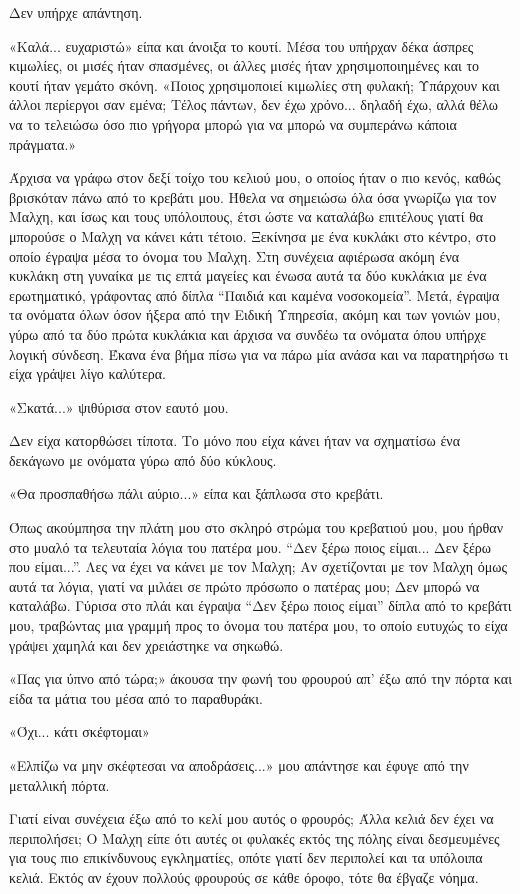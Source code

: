 \documentclass[12pt,twoside, openany]{book}
\begin{document}
Δεν υπήρχε απάντηση.

«Καλά... ευχαριστώ» είπα και άνοιξα το κουτί. Μέσα του υπήρχαν δέκα άσπρες κιμωλίες, οι μισές ήταν σπασμένες, οι άλλες μισές ήταν χρησιμοποιημένες και το κουτί ήταν γεμάτο σκόνη. «Ποιος χρησιμοποιεί κιμωλίες στη φυλακή; Υπάρχουν και άλλοι περίεργοι σαν εμένα; Τέλος πάντων, δεν έχω χρόνο... δηλαδή έχω, αλλά θέλω να το τελειώσω όσο πιο γρήγορα μπορώ για να μπορώ να συμπεράνω κάποια πράγματα.»

Άρχισα να γράφω στον δεξί τοίχο του κελιού μου, ο οποίος ήταν ο πιο κενός, καθώς βρισκόταν πάνω από το κρεβάτι μου. Ήθελα να σημειώσω όλα όσα γνωρίζω για τον Μαλχη, και ίσως και τους υπόλοιπους, έτσι ώστε να καταλάβω επιτέλους γιατί θα μπορούσε ο Μαλχη να κάνει κάτι τέτοιο. Ξεκίνησα με ένα κυκλάκι στο κέντρο, στο οποίο έγραψα μέσα το όνομα του Μαλχη. Στη συνέχεια αφιέρωσα ακόμη ένα κυκλάκη στη γυναίκα με τις επτά μαγείες και ένωσα αυτά τα δύο κυκλάκια με ένα ερωτηματικό, γράφοντας από δίπλα “Παιδιά και καμένα νοσοκομεία”. Μετά, έγραψα τα ονόματα όλων όσον ήξερα από την Ειδική Υπηρεσία, ακόμη και των γονιών μου, γύρω από τα δύο πρώτα κυκλάκια και άρχισα να συνδέω τα ονόματα όπου υπήρχε λογική σύνδεση. Έκανα ένα βήμα πίσω για να πάρω μία ανάσα και να παρατηρήσω τι είχα γράψει λίγο καλύτερα.

«Σκατά...» ψιθύρισα στον εαυτό μου.

Δεν είχα κατορθώσει τίποτα. Το μόνο που είχα κάνει ήταν να σχηματίσω ένα δεκάγωνο με ονόματα γύρω από δύο κύκλους.

«Θα προσπαθήσω πάλι αύριο...» είπα και ξάπλωσα στο κρεβάτι.

Όπως ακούμπησα την πλάτη μου στο σκληρό στρώμα του κρεβατιού μου, μου ήρθαν στο μυαλό τα τελευταία λόγια του πατέρα μου. “Δεν ξέρω ποιος είμαι... Δεν ξέρω που είμαι...”. Λες να έχει να κάνει με τον Μαλχη; Αν σχετίζονται με τον Μαλχη όμως αυτά τα λόγια, γιατί να μιλάει σε πρώτο πρόσωπο ο πατέρας μου; Δεν μπορώ να καταλάβω. Γύρισα στο πλάι και έγραψα “Δεν ξέρω ποιος είμαι” δίπλα από το κρεβάτι μου, τραβώντας μια γραμμή προς το όνομα του πατέρα μου, το οποίο ευτυχώς το είχα γράψει χαμηλά και δεν χρειάστηκε να σηκωθώ.

«Πας για ύπνο από τώρα;» άκουσα την φωνή του φρουρού απ’ έξω από την πόρτα και είδα τα μάτια του μέσα από το παραθυράκι.

«Όχι... κάτι σκέφτομαι»

«Ελπίζω να μην σκέφτεσαι να αποδράσεις...» μου απάντησε και έφυγε από την μεταλλική πόρτα.

Γιατί είναι συνέχεια έξω από το κελί μου αυτός ο φρουρός; Άλλα κελιά δεν έχει να περιπολήσει; Ο Μαλχη είπε ότι αυτές οι φυλακές εκτός της πόλης είναι δεσμευμένες για τους πιο επικίνδυνους εγκληματίες, οπότε γιατί δεν περιπολεί και τα υπόλοιπα κελιά. Εκτός αν έχουν πολλούς φρουρούς σε κάθε όροφο, τότε θα έβγαζε νόημα.
\end{document}

